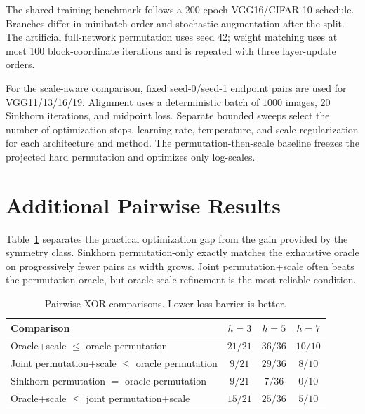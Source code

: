 \documentclass{article}
\begin{document}
The shared-training benchmark follows a 200-epoch VGG16/CIFAR-10 schedule.
Branches differ in minibatch order and stochastic augmentation after the split.
The artificial full-network permutation uses seed 42; weight matching uses at
most 100 block-coordinate iterations and is repeated with three layer-update
orders.

For the scale-aware comparison, fixed seed-0/seed-1 endpoint pairs are used for
VGG11/13/16/19.  Alignment uses a deterministic batch of $1000$ images, 20
Sinkhorn iterations, and midpoint loss.  Separate bounded sweeps select the
number of optimization steps, learning rate, temperature, and scale
regularization for each architecture and method.  The permutation-then-scale
baseline freezes the projected hard permutation and optimizes only log-scales.

\section{Additional Pairwise Results}

Table~\ref{tab:pairwise} separates the practical optimization gap from the gain
provided by the symmetry class.  Sinkhorn permutation-only exactly matches the
exhaustive oracle on progressively fewer pairs as width grows.  Joint
permutation+scale often beats the permutation oracle, but oracle scale
refinement is the most reliable condition.

\begin{table}[h]
\caption{Pairwise XOR comparisons.  Lower loss barrier is better.}
\label{tab:pairwise}
\centering
\small
\begin{tabular}{lccc}
\toprule
Comparison & $h=3$ & $h=5$ & $h=7$ \\
\midrule
Oracle+scale $\leq$ oracle permutation & $21/21$ & $36/36$ & $10/10$ \\
Joint permutation+scale $\leq$ oracle permutation & $9/21$ & $29/36$ & $8/10$ \\
Sinkhorn permutation $=$ oracle permutation & $9/21$ & $7/36$ & $0/10$ \\
Oracle+scale $\leq$ joint permutation+scale & $15/21$ & $25/36$ & $5/10$ \\
\bottomrule
\end{tabular}
\end{table}
\end{document}
